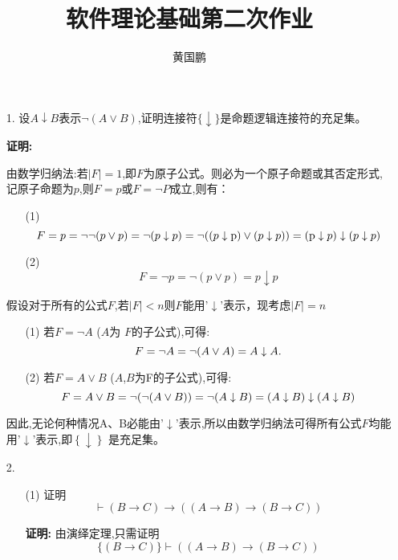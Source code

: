 \documentclass[11pt,oneside,a4paper]{article}
\author{黄国鹏}
\title{软件理论基础第二次作业 }
\begin{document}
\maketitle
\begin{itemize}
    \item[1.] 设$A \downarrow B $表示$\neg (A \vee B)$,证明连接符$\{ \downarrow \}$是命题逻辑连接符的充足集。
        
        \textbf{证明:}

            由数学归纳法:若$\lvert F \vert = 1$,即$F$为原子公式。则必为一个原子命题或其否定形式,记原子命题为$p$,则$F = p$或$F = \neg P $成立,则有：
            \begin{enumerate}
                \item[(1)]\[F = p = \neg \neg (p \vee p) = \neg (p \downarrow p) = \neg ((p \downarrow {\rm{p}}) \vee (p \downarrow p)) = ({\rm{p}} \downarrow p) \downarrow (p \downarrow p)\]
                \item[(2)]\[F = \neg p = \neg (p \vee p) = p \downarrow p\]
            \end{enumerate}
            假设对于所有的公式$F$,若$\lvert F \vert < n$则$F$能用'$\downarrow$'表示，现考虑$\lvert F \vert = n$
            \begin{enumerate}
                \item[(1)]若$F=\neg A$ ($A$为 $F$的子公式),可得: 
                \[F = \neg A = \neg (A \vee A){\rm{ }} = A \downarrow A.\]
                \item[(2)]若$F = A \vee B$ ($A$,$B$为F的子公式),可得:
                \[F = A \vee B = \neg (\neg (A \vee B)){\rm{ }} = \neg (A \downarrow B){\rm{ }} = {\rm{ }}(A \downarrow B) \downarrow (A \downarrow B)\]
            \end{enumerate}
            因此,无论何种情况A、B必能由'$\downarrow$'表示,所以由数学归纳法可得所有公式$F$均能用'$\downarrow$'表示,即$\left\{  \downarrow  \right\}$ 是充足集。
    \item[2.] 
        \begin{itemize}
            \item[(1)] 证明\[ \vdash (B \to C) \to ((A \to B) \to (B \to C))\] \par
            \textbf{证明:} \quad 由演绎定理,只需证明
                            \begin{equation*}
                               \{ (B \to C) \}  \vdash ((A \to B) \to (B \to C))
                            \end{equation*}
            \begin{itemize}

\end{itemize}
\end{itemize}
\end{itemize}
\end{document}
